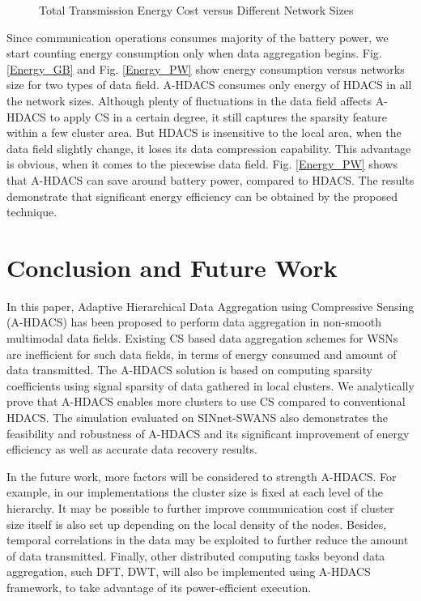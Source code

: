 \documentclass[conference]{IEEEtran}
\begin{document}
\begin{figure}[!t]
\centering
{}
\qquad
{}
\caption{Total Transmission Energy Cost versus Different Network Sizes}
\label{TotalCost}
\end{figure}

Since communication operations consumes majority of the battery power, we start counting energy consumption 
only when data aggregation begins. Fig. \ref{Energy_GB}  and Fig. \ref{Energy_PW} show energy consumption
versus networks size for two types of data field. A-HDACS consumes only  
energy of HDACS in all the network sizes. Although plenty of 
fluctuations in the data field affects A-HDACS to apply CS in a certain degree, 
it still captures the sparsity feature within a few cluster area. But HDACS is 
insensitive to the local area, when the data field slightly change, it loses 
its data compression capability. This advantage is obvious, when it comes to 
the piecewise data field. Fig. \ref{Energy_PW} shows that A-HDACS can save around 
 battery power, compared to HDACS. The results demonstrate that significant 
energy efficiency can be obtained by the proposed technique.  

\section{Conclusion and Future Work}
In this paper, Adaptive Hierarchical Data Aggregation using Compressive Sensing (A-HDACS) has been 
proposed to perform data aggregation in non-smooth multimodal data fields. Existing CS based data aggregation schemes for WSNs are 
inefficient for such data fields, in terms of energy consumed and amount of data transmitted.
The A-HDACS solution is based on computing sparsity coefficients using 
signal sparsity of data gathered in local clusters.
We analytically prove that A-HDACS enables more clusters to use CS 
compared to conventional HDACS. The simulation evaluated on SINnet-SWANS also demonstrates
the feasibility and robustness of A-HDACS and its significant improvement of 
energy efficiency as well as accurate data recovery results.

In the future work, more factors will be considered to strength A-HDACS. For example, 
in our implementations the cluster size is fixed at each level of the hierarchy. 
It may be possible to further improve communication cost if 
cluster size itself is also set up depending on the local density of the nodes. Besides, temporal correlations in the data may be exploited to further reduce
the amount of data transmitted. Finally, other distributed computing tasks beyond data aggregation, such DFT, DWT, will also be implemented using  
A-HDACS framework, to take advantage of its power-efficient execution. 


\end{document}
